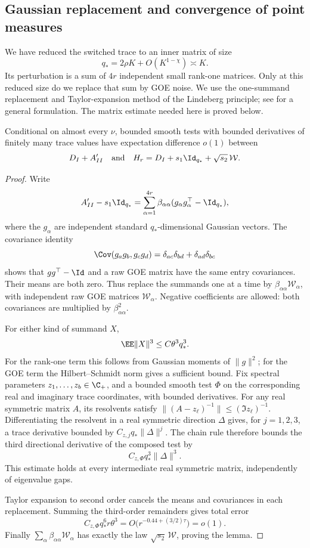 \subsection{Gaussian replacement and convergence of point measures}

We have reduced the switched trace to an inner matrix of size
\[
 q_*=2\rho K+O(K^{1-\chi})\asymp K.
\]
Its perturbation is a sum of \(4r\) independent small rank-one matrices.
Only at this reduced size do we replace that sum by GOE noise.
We use the one-summand replacement and Taylor-expansion method of the
Lindeberg principle; see \citet{ChatterjeeLindeberg} for a general
formulation. The matrix estimate needed here is proved below.

\begin{lemma}\label{sw:lindeberg}
Conditional on almost every \(\nu\), bounded smooth tests with bounded
derivatives of finitely many trace values have expectation difference
\(o(1)\) between
\[
 D_I+A'_{II}
 \quad\hbox{and}\quad
 H_r=D_I+s_1\Id_{q_*}+\sqrt{s_2}\,\mathcal W.
\]
\end{lemma}

\begin{proof}
Write
\[
 A'_{II}-s_1\Id_{q_*}
 =\sum_{\alpha=1}^{4r}
 \beta_{\alpha\alpha}(g_\alpha g_\alpha^\top-\Id_{q_*}),
\]
where the \(g_\alpha\) are independent standard \(q_*\)-dimensional
Gaussian vectors. The covariance identity
\[
 \Cov(g_ag_b,g_cg_d)
 =\delta_{ac}\delta_{bd}+\delta_{ad}\delta_{bc}
\]
shows that \(gg^\top-\Id\) and a raw GOE matrix have the same entry
covariances. Their means are both zero. Thus replace the summands one at
a time by \(\beta_{\alpha\alpha}\mathcal W_\alpha\), with independent raw
GOE matrices \(\mathcal W_\alpha\). Negative coefficients are allowed:
both covariances are multiplied by \(\beta_{\alpha\alpha}^2\).

For either kind of summand \(X\),
\[
 \EE\|X\|^3\le C\theta^3q_*^3.
\]
For the rank-one term this follows from Gaussian moments of \(\|g\|^2\);
for the GOE term the Hilbert--Schmidt norm gives a sufficient bound.
Fix spectral parameters \(z_1,\ldots,z_b\in\C_+\), and a bounded smooth
test \(\Phi\) on the corresponding real and imaginary trace coordinates,
with bounded derivatives. For any real symmetric matrix \(A\), its
resolvents satisfy \(\|(A-z_\ell)^{-1}\|\le(\Im z_\ell)^{-1}\).
Differentiating the resolvent in a real symmetric direction \(\Delta\)
gives, for \(j=1,2,3\), a trace derivative bounded by
\(C_{z,j}q_*\|\Delta\|^j\). The chain rule therefore bounds the third
directional derivative of the composed test by
\[
 C_{z,\Phi}q_*^3\|\Delta\|^3.
\]
This estimate holds at every intermediate real symmetric matrix,
independently of eigenvalue gaps.

Taylor expansion to second order cancels the means and covariances in
each replacement. Summing the third-order remainders gives total error
\[
 C_{z,\Phi}q_*^6 r\theta^3
 =O\bigl(r^{-0.44+(3/2)\tau}\bigr)=o(1).
\]
Finally \(\sum_\alpha\beta_{\alpha\alpha}\mathcal W_\alpha\) has exactly
the law \(\sqrt{s_2}\,\mathcal W\), proving the lemma.
\end{proof}

